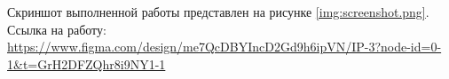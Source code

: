 \documentclass{bsuir}
\begin{document}
\maketitle
\mainmatter

Скриншот выполненной работы представлен на рисунке \ref{img:screenshot.png}.
Ссылка на работу:
\url{https://www.figma.com/design/me7QcDBYIncD2Gd9h6ipVN/IP-3?node-id=0-1&t=GrH2DFZQhr8i9NY1-1}

\end{document}
